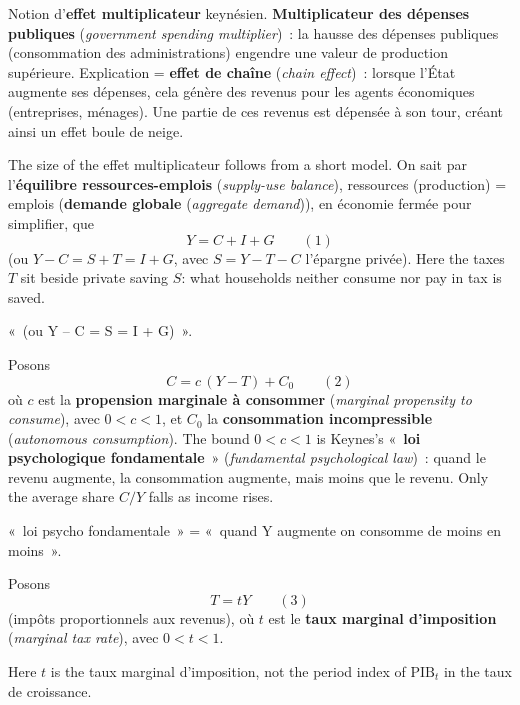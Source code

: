 \begin{definition}
  Notion d'\textbf{effet multiplicateur} keynésien. \textbf{Multiplicateur des
  dépenses publiques} (\textit{government spending multiplier})~: la hausse des
  dépenses publiques (consommation des administrations) engendre une valeur de
  production supérieure. Explication = \textbf{effet de chaîne} (\textit{chain
  effect})~: lorsque l'État augmente ses dépenses, cela génère des revenus pour
  les agents économiques (entreprises, ménages). Une partie de ces revenus est
  dépensée à son tour, créant ainsi un effet boule de neige.
\end{definition}

The size of the effet multiplicateur follows from a short model. On sait par
l'\textbf{équilibre ressources-emplois} (\textit{supply-use balance}),
ressources (production) = emplois (\textbf{demande globale}
(\textit{aggregate demand})), en économie fermée pour simplifier, que
\[
  Y = C + I + G \qquad (1)
\]
(ou $Y - C = S + T = I + G$, avec $S = Y - T - C$ l'épargne privée). Here the
taxes $T$ sit beside private saving $S$: what households neither consume nor pay
in tax is saved.

\begin{remark}
  «~(ou Y -- C = S = I + G)~».
\end{remark}

Posons
\[
  C = c\,(Y - T) + C_0 \qquad (2)
\]
où $c$ est la \textbf{propension marginale à consommer} (\textit{marginal
propensity to consume}), avec $0 < c < 1$, et $C_0$ la \textbf{consommation
incompressible} (\textit{autonomous consumption}). The bound $0 < c < 1$ is
Keynes's «~\textbf{loi psychologique fondamentale}~» (\textit{fundamental
psychological law})~: quand le revenu augmente, la consommation augmente, mais
moins que le revenu. Only the average share $C/Y$ falls as income rises.

\begin{remark}
  «~loi psycho fondamentale~» = «~quand Y augmente on consomme de moins en
  moins~».
\end{remark}

Posons
\[
  T = tY \qquad (3)
\]
(impôts proportionnels aux revenus), où $t$ est le \textbf{taux marginal
d'imposition} (\textit{marginal tax rate}), avec $0 < t < 1$.

\begin{notation}
  Here $t$ is the taux marginal d'imposition, not the period index of
  $\text{PIB}_t$ in the taux de croissance.
\end{notation}

